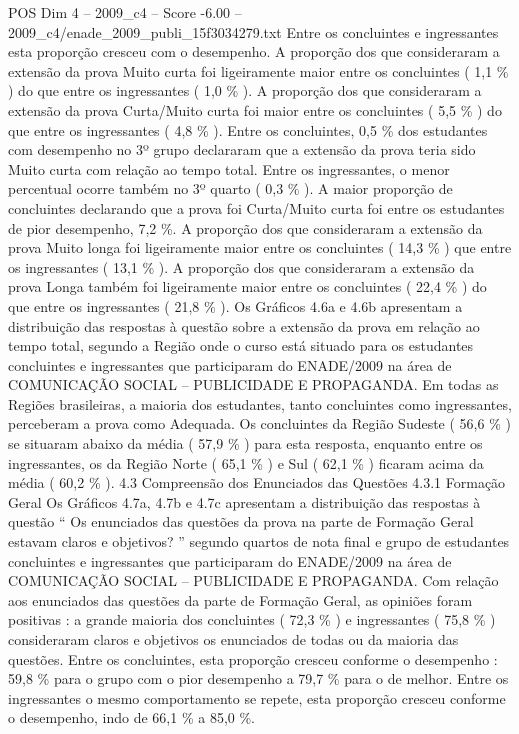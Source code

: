 \begin{textsample}{POS Dim 4 – 2009\_c4 – Score -6.00 – 2009\_c4/enade\_2009\_publi\_15f3034279.txt}
Entre os concluintes e ingressantes esta proporção cresceu com o desempenho.
A proporção dos que consideraram a extensão da prova Muito curta foi ligeiramente maior entre os concluintes ( 1,1 \% ) do que entre os ingressantes ( 1,0 \% ).
A proporção dos que consideraram a extensão da prova Curta/Muito curta foi maior entre os concluintes ( 5,5 \% ) do que entre os ingressantes ( 4,8 \% ).
Entre os concluintes, 0,5 \% dos estudantes com desempenho no 3º grupo declararam que a extensão da prova teria sido Muito curta com relação ao tempo total.
Entre os ingressantes, o menor percentual ocorre também no 3º quarto ( 0,3 \% ).
A maior proporção de concluintes declarando que a prova foi Curta/Muito curta foi entre os estudantes de pior desempenho, 7,2 \%.
A proporção dos que consideraram a extensão da prova Muito longa foi ligeiramente maior entre os concluintes ( 14,3 \% ) que entre os ingressantes ( 13,1 \% ).
A proporção dos que consideraram a extensão da prova Longa também foi ligeiramente maior entre os concluintes ( 22,4 \% ) do que entre os ingressantes ( 21,8 \% ).
Os Gráficos 4.6a e 4.6b apresentam a distribuição das respostas à questão sobre a extensão da prova em relação ao tempo total, segundo a Região onde o curso está situado para os estudantes concluintes e ingressantes que participaram do ENADE/2009 na área de COMUNICAÇÃO SOCIAL – PUBLICIDADE E PROPAGANDA.
Em todas as Regiões brasileiras, a maioria dos estudantes, tanto concluintes como ingressantes, perceberam a prova como Adequada.
Os concluintes da Região Sudeste ( 56,6 \% ) se situaram abaixo da média ( 57,9 \% ) para esta resposta, enquanto entre os ingressantes, os da Região Norte ( 65,1 \% ) e Sul ( 62,1 \% ) ficaram acima da média ( 60,2 \% ). 4.3 Compreensão dos Enunciados das Questões 4.3.1 Formação Geral Os Gráficos 4.7a, 4.7b e 4.7c apresentam a distribuição das respostas à questão “ Os enunciados das questões da prova na parte de Formação Geral estavam claros e objetivos? ” segundo quartos de nota final e grupo de estudantes concluintes e ingressantes que participaram do ENADE/2009 na área de COMUNICAÇÃO SOCIAL – PUBLICIDADE E PROPAGANDA.
Com relação aos enunciados das questões da parte de Formação Geral, as opiniões foram positivas : a grande maioria dos concluintes ( 72,3 \% ) e ingressantes ( 75,8 \% ) consideraram claros e objetivos os enunciados de todas ou da maioria das questões.
Entre os concluintes, esta proporção cresceu conforme o desempenho : 59,8 \% para o grupo com o pior desempenho a 79,7 \% para o de melhor.
Entre os ingressantes o mesmo comportamento se repete, esta proporção cresceu conforme o desempenho, indo de 66,1 \% a 85,0 \%.

\end{textsample}
